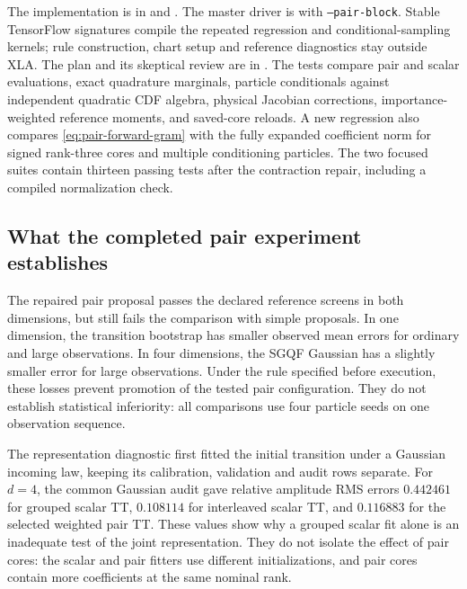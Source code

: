 \documentclass[11pt]{article}
\begin{document}
The implementation is in  and
. The master driver is
 with
\texttt{--pair-block}. Stable TensorFlow signatures compile the repeated
regression and conditional-sampling kernels; rule construction, chart setup
and reference diagnostics stay outside XLA. The plan and its skeptical review
are in .
The tests compare pair and scalar evaluations, exact quadrature marginals,
particle conditionals against independent quadratic CDF algebra, physical
Jacobian corrections, importance-weighted reference moments, and saved-core
reloads. A new regression also compares \eqref{eq:pair-forward-gram} with the
fully expanded coefficient norm for signed rank-three cores and multiple
conditioning particles. The two focused suites contain thirteen passing
tests after the contraction repair, including a compiled normalization check.

\subsection{What the completed pair experiment establishes}
\label{sec:pair-completed-results}

The repaired pair proposal passes the declared reference screens in both
dimensions, but still fails the comparison with simple proposals. In one
dimension, the transition bootstrap has smaller observed mean errors for
ordinary and large observations. In four dimensions, the SGQF Gaussian has a
slightly smaller error for large observations. Under the rule specified before
execution, these losses prevent promotion of the tested pair configuration.
They do not establish statistical inferiority: all comparisons use four
particle seeds on one observation sequence.

The representation diagnostic first fitted the initial transition under a
Gaussian incoming law, keeping its calibration, validation and audit rows
separate. For $d=4$, the common Gaussian audit gave relative amplitude RMS
errors $0.442461$ for grouped scalar TT, $0.108114$ for interleaved scalar TT,
and $0.116883$ for the selected weighted pair TT. These values show why a
grouped scalar fit alone is an inadequate test of the joint representation.
They do not isolate the effect of pair cores: the scalar and pair fitters use
different initializations, and pair cores contain more coefficients at the
same nominal rank.
\end{document}
